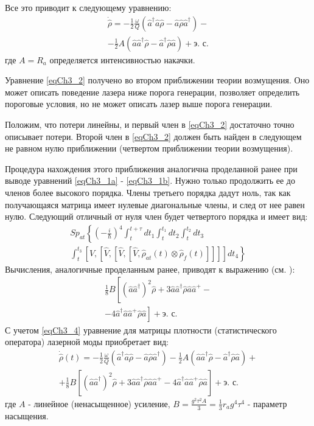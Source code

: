 Все это приводит к следующему уравнению:
\begin{eqnarray}
\dot{\hat{\rho}} =
- \frac{1}{2}\frac{\omega}{Q}
\left(\hat{a}^{\dag}\hat{a}\hat{\rho} - 
\hat{a}\hat{\rho}\hat{a}^{\dag}
\right)
-
\nonumber \\
- \frac{1}{2}A
\left(\hat{a}\hat{a}^{\dag}\hat{\rho} - 
\hat{a}^{\dag}\hat{\rho}\hat{a}
\right)
 + \mbox{э. с.}
\label{eqCh3_2}
\end{eqnarray}
где $A = R_a$ определяется интенсивностью накачки.

Уравнение \eqref{eqCh3_2} получено во втором приближении теории
возмущения. Оно может описать поведение лазера ниже
порога генерации, позволяет определить пороговые условия, но не может
описать лазер выше порога генерации.  

Положим, что потери линейны, и первый член в \eqref{eqCh3_2}
достаточно точно описывает потери. Второй член в \eqref{eqCh3_2} должен быть
найден в следующем не равном нулю приближении (четвертом приближении
теории возмущения).
 
Процедура нахождения этого приближения аналогична проделанной ранее
при выводе уравнений \eqref{eqCh3_1a} - \ref{eqCh3_1b}. Нужно только
продолжить ее до членов более высокого порядка. Члены третьего порядка
дадут ноль, так как получающаяся матрица имеет нулевые диагональные
члены, и след от нее равен нулю. Следующий отличный от нуля член будет 
четвертого порядка и имеет вид: 
\begin{eqnarray}
Sp_{at}\left\{
\left(-\frac{i}{\hbar}\right)^4
\int_t^{t+\tau}dt_1
\int_t^{t_1}dt_2
\int_t^{t_2}dt_3
\right.
\nonumber \\
\left.
\int_t^{t_3}
\left[\hat{V},
\left[\hat{V},
\left[\hat{V},
\left[\hat{V},
\hat{\rho}_{at}\left(t\right)
\otimes
\hat{\rho}_{f}\left(t\right)
\right]
\right]
\right]
\right]
dt_4
\right\}
\label{eqCh3_3}
\end{eqnarray}
Вычисления, аналогичные проделанным ранее, приводят к выражению
(см. \cite{bMandel2000}):
\begin{eqnarray}
\frac{1}{8}B\left[
\left(\hat{a} \hat{a}^{\dag}\right)^2\hat{\rho}
+ 3 \hat{a} \hat{a}^{\dag} \hat{\rho} \hat{a} \hat{a}^{+} -
\right.
\nonumber \\
\left.
-
4 \hat{a}^{\dag} \hat{a} \hat{a}^{+} \hat{\rho} \hat{a}
\right] + \mbox{э. с.}
\label{eqCh3_4}
\end{eqnarray}
С учетом \eqref{eqCh3_4} уравнение для матрицы плотности
(статистического оператора) лазерной моды приобретает вид: 
\begin{eqnarray}
\dot{\hat{\rho}}\left(t\right) = 
- \frac{1}{2}\frac{\omega}{Q}
\left(\hat{a}^{\dag}\hat{a}\hat{\rho} - 
\hat{a}\hat{\rho}\hat{a}^{\dag}
\right)
- \frac{1}{2}A
\left(\hat{a}\hat{a}^{\dag}\hat{\rho} - 
\hat{a}^{\dag}\hat{\rho}\hat{a}
\right) + 
\nonumber \\
+ \frac{1}{8}B\left[
\left(\hat{a} \hat{a}^{\dag}\right)^2\hat{\rho}
+ 3 \hat{a} \hat{a}^{\dag} \hat{\rho} \hat{a} \hat{a}^{+} -
4 \hat{a}^{\dag} \hat{a} \hat{a}^{+} \hat{\rho} \hat{a}
\right] + \mbox{э. с.}
\label{eqCh3_5}
\end{eqnarray}
где $A$ - линейное (ненасыщенное) усиление, 
$B=\frac{g^2 \tau^2 A}{3} = \frac{1}{3}r_ag^4\tau^4$ - параметр
насыщения.

